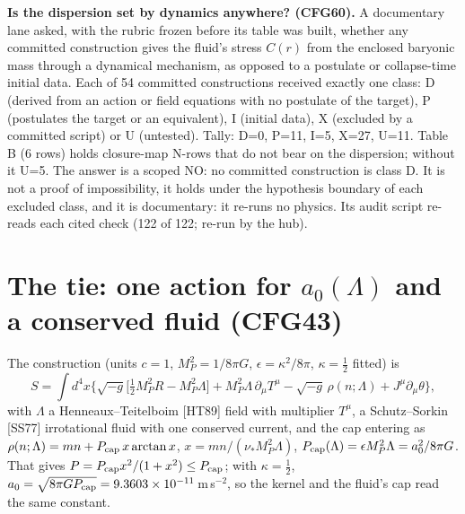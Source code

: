 \documentclass[10pt]{article}
\begin{document}
\textbf{Is the dispersion set by dynamics anywhere? (CFG60).} A documentary lane asked, with the rubric frozen before its table was built, whether any committed construction gives the fluid's stress $C(r)$ from the enclosed baryonic mass through a dynamical mechanism, as opposed to a postulate or collapse-time initial data. Each of 54 committed constructions received exactly one class: D (derived from an action or field equations with no postulate of the target), P (postulates the target or an equivalent), I (initial data), X (excluded by a committed script) or U (untested). Tally: D=0, P=11, I=5, X=27, U=11. Table B (6 rows) holds closure-map N-rows that do not bear on the dispersion; without it U=5. The answer is a scoped NO: no committed construction is class D. It is not a proof of impossibility, it holds under the hypothesis boundary of each excluded class, and it is documentary: it re-runs no physics. Its audit script re-reads each cited check (122 of 122; re-run by the hub).

\section{The tie: one action for $a_0(\Lambda)$ and a conserved fluid (CFG43)}\label{sec:tie}

The construction (units $c=1$, $M_P^2=1/8\pi G$, $\epsilon=\kappa^2/8\pi$, $\kappa=\tfrac12$ fitted) is
\begin{equation}
S=\int d^4x\Big\{\sqrt{-g}\big[\tfrac12 M_P^2R-M_P^2\Lambda\big]+M_P^2\Lambda\,\partial_\mu T^\mu-\sqrt{-g}\,\rho(n;\Lambda)+J^\mu\partial_\mu\theta\Big\},
\end{equation}
with $\Lambda$ a Henneaux--Teitelboim [HT89] field with multiplier $T^\mu$, a Schutz--Sorkin [SS77] irrotational fluid with one conserved current, and the cap entering as $\rho(n;\Lambda)=mn+P_{\rm cap}\,x\arctan x$, $x=mn/(\nu_*M_P^2\Lambda)$, $P_{\rm cap}(\Lambda)=\epsilon M_P^2\Lambda=a_0^2/8\pi G$. That gives $P=P_{\rm cap}x^2/(1+x^2)\le P_{\rm cap}$; with $\kappa=\tfrac12$, $a_0=\sqrt{8\pi GP_{\rm cap}}=9.3603\times10^{-11}$\,m\,s$^{-2}$, so the kernel and the fluid's cap read the same constant.
\end{document}

